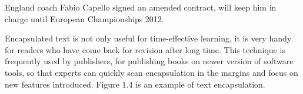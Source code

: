 \textsf{England coach Fabio Capello signed an amended contract, will keep him in charge until European Championships 2012.}

Encapsulated text is not only useful for time-effective learning, it is very handy for readers who have come back for revision after long time. This technique is frequently used by publishers, for publishing books
on newer version of software tools, so that experts can quickly scan encapsulation in the margins and focus on new features introduced. Figure 1.4  is an example
of text encapsulation.




% 
% 


\clearpage 
